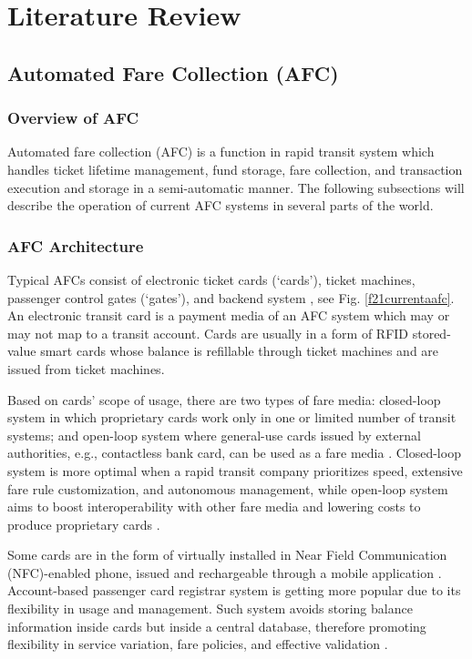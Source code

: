 \documentclass[a4paper,12pt,oneside, utf8x]{report}
\begin{document}
\chapter{Literature Review}
\label{clreview}
\section{Automated Fare Collection (AFC)}
\subsection{Overview of AFC}
Automated fare collection (AFC) is a function in rapid transit system which handles ticket lifetime management, fund storage, fare collection, and transaction execution and storage in a semi-automatic manner. The following subsections will describe the operation of current AFC systems in several parts of the world.
\subsection{AFC Architecture}
Typical AFCs consist of electronic ticket cards (‘cards’), ticket machines, passenger control gates (‘gates’), and backend system \cite{a11}, see Fig. \ref{f21currentaafc}. An electronic transit card is a payment media of an AFC system which may or may not map to a transit account. Cards are usually in a form of RFID stored-value smart cards whose balance is refillable through ticket machines and are issued from ticket machines.

Based on cards’ scope of usage, there are two types of fare media: closed-loop system in which proprietary cards work only in one or limited number of transit systems; and open-loop system where general-use cards issued by external authorities, e.g., contactless bank card, can be used as a fare media \cite{a12,a13}. Closed-loop system is more optimal when a rapid transit company prioritizes speed, extensive fare rule customization, and autonomous management, while open-loop system aims to boost interoperability with other fare media and lowering costs to produce proprietary cards \cite{a14}.

Some cards are in the form of virtually installed in Near Field Communication (NFC)-enabled phone, issued and rechargeable through a mobile application \cite{a13,a15}. Account-based passenger card registrar system is getting more popular due to its flexibility in usage and management. Such system avoids storing balance information inside cards but inside a central database, therefore promoting flexibility in service variation, fare policies, and effective validation \cite{a13}.
\end{document}
